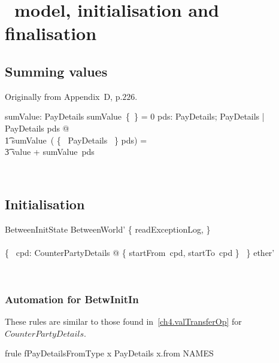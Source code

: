 \chapter{\Betw\ model, initialisation and finalisation}\label{ch6}

\section{Summing values}\label{ch6.sumValue}

Originally from Appendix~D, p.$226$.
\begin{LADef}
\begin{axdef}
   sumValue: \finset PayDetails \fun \nat
\where
      sumValue~\{~\} = 0
   \also
      \forall pds: \finset PayDetails; PayDetails | \theta PayDetails \notin pds @ \\
          \t1 sumValue~( \{~ \theta PayDetails ~\} \cup pds) = \\
                \t3 value + sumValue~pds
\end{axdef}~\end{LADef}

\section{Initialisation}\label{ch6.init}

\begin{LSDef}
\begin{schema}{BetweenInitState}
  BetweenWorld' \where \{ readExceptionLog, \bot \}
  \\ %
  \cup
  \\ %
  \bigcup \{~ cpd: CounterPartyDetails @ \{ startFrom~cpd, startTo~cpd
  \} ~\}
  \also %
  \subseteq ether'
\end{schema}~\end{LSDef}

\subsection*{Automation for BetwInitIn}

These rules are similar to those found in~\ref{ch4.valTransferOp} for $CounterPartyDetails$.
%
\begin{LFRT}
\begin{theorem}{frule fPayDetailsFromType}
   x \in PayDetails \implies x.from \in NAMES
\end{theorem}~\end{LFRT}

